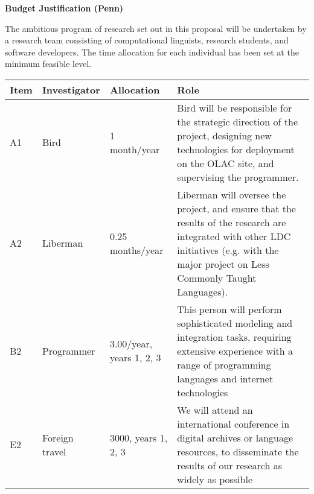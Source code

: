 \documentclass[11pt]{nsf}
\begin{document}
\begin{center}\textbf{\Large
Budget Justification (Penn)
}\end{center}

The ambitious program of research set out in this proposal will be
undertaken by a research team consisting of computational linguists,
research students, and software developers.  The time allocation for
each individual has been set at the minimum feasible level.

\vspace{1ex}

{\small\noindent
\begin{tabular}{lllp{3in}}
\textbf{Item} &
\textbf{Investigator} & \textbf{Allocation} & \textbf{Role} \\ \hline

A1 & Bird & 1 month/year &
Bird will be responsible for the strategic direction of the project,
designing new technologies for deployment on the OLAC site,
and supervising the programmer. \\

A2 & Liberman & 0.25 months/year &
Liberman will oversee the project, and ensure that the results of the
research are integrated with other LDC initiatives (e.g. with the
major project on Less Commonly Taught Languages).\\

B2 & Programmer & 3.00/year, years 1, 2, 3 &
This person will perform sophisticated modeling and integration tasks,
requiring extensive experience with a range of programming languages
and internet technologies \\

E2 & Foreign travel & 3000, years 1, 2, 3 &
We will attend an international conference in digital archives or
language resources, to disseminate the results of our research as
widely as possible \\

\end{tabular}}
\vspace{1ex}

\end{document}
